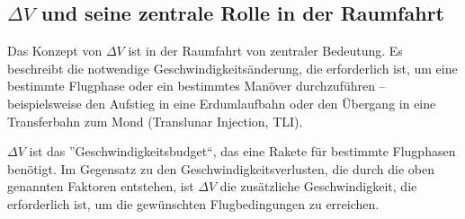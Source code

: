 %
%

\subsection{\(\Delta V\) und seine zentrale Rolle in der Raumfahrt}
Das Konzept von \(\Delta V\) ist in der Raumfahrt von zentraler Bedeutung. 
Es beschreibt die notwendige Geschwindigkeitsänderung, die erforderlich ist, um eine bestimmte Flugphase oder ein bestimmtes Manöver durchzuführen – beispielsweise den Aufstieg in eine Erdumlaufbahn oder den Übergang in eine Transferbahn zum Mond (Translunar Injection, TLI).
%
%

\(\Delta V\) ist das ''Geschwindigkeitsbudget``, das eine Rakete für bestimmte Flugphasen benötigt. 
%
Im Gegensatz zu den Geschwindigkeitsverlusten, die durch die oben genannten Faktoren entstehen, ist \(\Delta V\) die zusätzliche Geschwindigkeit, die erforderlich ist, um die gewünschten Flugbedingungen zu erreichen.


